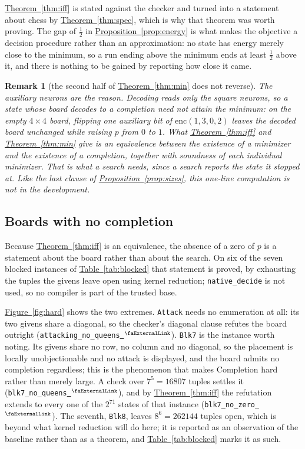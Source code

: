 \documentclass{easychair}
\newtheorem{remark}[thm]{Remark}
\newcommand{\thmref}[1]{\textcolor{academicpurple}{\hyperref[#1]{Theorem~\ref*{#1}}}}
\newcommand{\propref}[1]{\textcolor{academicpurple}{\hyperref[#1]{Proposition~\ref*{#1}}}}
\newcommand{\tabref}[1]{\textcolor{academicpurple}{\hyperref[#1]{Table~\ref*{#1}}}}
\newcommand{\figref}[1]{\textcolor{academicpurple}{\hyperref[#1]{Figure~\ref*{#1}}}}
\newcommand{\extlink}{~\ensuremath{{}^\text{\faExternalLink}}}
\newcommand{\repoowner}{mkaratarakis/HNBM}
\newcommand{\reporef}{1bd91612ee31180f6c99fa11090b713f3012ead4}
\newcommand{\repo}{https://github.com/\repoowner/blob/\reporef}
\newcommand{\srcl}[2]{\href{\repo/#1\#L#2}{\extlink}}
\newcommand{\qsrc}[2]{\srcl{HopfieldNet/QUBO/Instances/Queens/#1}{#2}}
\begin{document}
\thmref{thm:iff} is stated against the checker and turned into a statement about chess by
\thmref{thm:spec}, which is why that theorem was worth proving. The gap of $\tfrac12$ in
\propref{prop:energy} is what makes the objective a decision procedure rather than an
approximation: no state has energy merely close to the minimum, so a run ending above the minimum
ends at least $\tfrac12$ above it, and there is nothing to be gained by reporting how close it came.

\begin{remark}[the second half of \thmref{thm:min} does not reverse]\label{rem:slack}
The auxiliary neurons are the reason. Decoding reads only the square neurons, so a state whose board
decodes to a completion need not attain the minimum: on the empty $4 \times 4$ board, flipping one
auxiliary bit of $\mathrm{enc}(1,3,0,2)$ leaves the decoded board unchanged while raising $p$ from
$0$ to $1$. What \thmref{thm:iff} and \thmref{thm:min} give is an equivalence between the existence
of a minimizer and the existence of a completion, together with soundness of each individual
minimizer. That is what a search needs, since a search reports the state it stopped at. Like the
last clause of \propref{prop:sizes}, this one-line computation is not in the development.
\end{remark}

\subsection*{Boards with no completion}

Because \thmref{thm:iff} is an equivalence, the absence of a zero of $p$ is a statement about the
board rather than about the search. On six of the seven blocked instances of \tabref{tab:blocked}
that statement is proved, by exhausting the tuples the givens leave open using kernel reduction;
\lstinline{native_decide} is not used, so no compiler is part of the trusted base.

\figref{fig:hard} shows the two extremes. \texttt{Attack} needs no enumeration at all: its two
givens share a diagonal, so the checker's diagonal clause refutes the board outright
(\lstinline{attacking_no_queens}\qsrc{Examples.lean}{192}). \texttt{Blk7}
is the instance worth noting. Its givens share no row, no column and no diagonal, so the placement
is locally unobjectionable and no attack is displayed, and the board admits no completion regardless;
this is the phenomenon that makes Completion hard rather than merely large. A check over
$7^{5} = 16807$ tuples settles it (\lstinline{blk7_no_queens}\qsrc{Bench.lean}{388}), and by
\thmref{thm:iff} the refutation extends to every one of the $2^{71}$ states of that instance
(\lstinline{blk7_no_zero}\qsrc{Bench.lean}{403}). The seventh, \texttt{Blk8}, leaves $8^{6} = 262144$ tuples
open, which is beyond what kernel reduction will do here; it is reported as an observation of the
baseline rather than as a theorem, and \tabref{tab:blocked} marks it as such.
\end{document}
